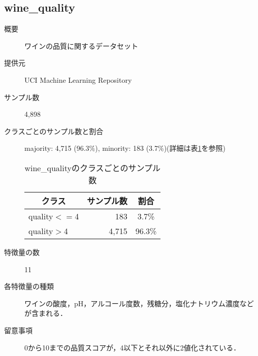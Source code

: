 \subsection{wine\_quality}
\begin{description}
    \item[概要] ワインの品質に関するデータセット\cite{winequality}
    \item[提供元] UCI Machine Learning Repository
    \item[サンプル数] 4,898
    \item[クラスごとのサンプル数と割合] majority: 4,715 (96.3\%), minority: 183 (3.7\%)(詳細は表\ref{tab:winequality}を参照)
    \begin{table}[htbp]
        \centering
        \caption{wine\_qualityのクラスごとのサンプル数}
        \label{tab:winequality}
        \begin{tabular}{lrc} \hline
            \multicolumn{1}{c}{クラス}&
            \multicolumn{1}{c}{サンプル数}&
            \multicolumn{1}{c}{割合}\\
            \hline
            \hline
            quality$<=$4& 183& 3.7\% \\
            quality$>$4& 4,715& 96.3\% \\
            \hline
        \end{tabular}
    \end{table}

    \item[特徴量の数] 11
    \item[各特徴量の種類] ワインの酸度，pH，アルコール度数，残糖分，塩化ナトリウム濃度などが含まれる．
    \item[留意事項] 0から10までの品質スコアが，4以下とそれ以外に2値化されている．
\end{description}


